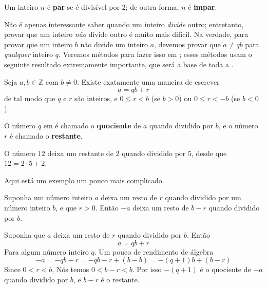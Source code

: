 \begin{definition}
\label{defEvenOdd}
Um inteiro $n$ é \textbf{par} se é divisível por $2$; de outra forma, $n$ é \textbf{impar}.
\end{definition}
Não é apenas interessante saber quando um inteiro \textit{divide} outro; entretanto, provar que um inteiro \textit{não} divide outro é muito mais difícil. Na verdade, para provar que um inteiro $b$ não divide um inteiro $a$, devemos provar que $a \ne qb$ para \textit{qualquer} inteiro $q$. Veremos métodos para fazer isso em ; esses métodos usam o seguinte resultado extremamente importante, que será a base de toda a .

\begin{theorem}
\label{thmDivisionPreliminary}
Seja $a,b \in \mathbb{Z}$ com $b \ne 0$. Existe exatamente uma maneira de escrever
\[ a = qb + r \]
de tal modo que $q$ e $r$ são inteiros, e $0 \le r < b$ (se $b > 0$) ou $0 \le r < -b$ (se $b < 0$).
\end{theorem}

O número $q$ em  é chamado o \textbf{quociente} de $a$ quando dividido por $b$, e o número $r$ é chamado o \textbf{restante}.

\begin{example}
O número $12$ deixa um  restante de $2$ quando dividido por $5$, desde que $12 = 2 \cdot 5 + 2$.
\end{example}

Aqui está um exemplo um pouco mais complicado.

\begin{proposition}
Suponha um número inteiro $a$ deixa um resto de $r$ quando dividido por um número inteiro $b$, e que $r>0$. Então $-a$ deixa um resto de $b-r$ quando dividido por $b$.
\end{proposition}

\begin{cproof}
Suponha que $a$ deixa um resto de $r$ quando dividido por $b$. Então
\[ a=qb+r \]
Para algum número inteiro $q$. Um pouco de rendimento de álgebra
\[ -a = -qb-r = -qb-r+(b-b) = -(q+1)b + (b-r) \]
Since $0<r<b$, Nós temos $0<b-r<b$. Por isso $-(q+1)$ é o quociente de $-a$ quando dividido por $b$, e $b-r$ é o restante.
\end{cproof}

